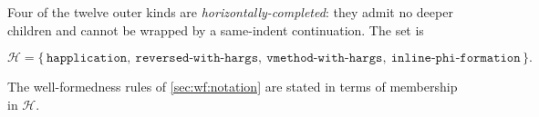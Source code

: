 Four of the twelve outer kinds are \emph{horizontally-completed}:
  they admit no deeper children and cannot be wrapped by a same-indent
   continuation.
The set is

\begin{equation*}
  \mathcal{H} = \{\,
    \mathtt{happlication},\
    \mathtt{reversed\text{-}with\text{-}hargs},\
    \mathtt{vmethod\text{-}with\text{-}hargs},\
    \mathtt{inline\text{-}phi\text{-}formation}
    \,\}.
\end{equation*}

The well-formedness rules of \cref{sec:wf:notation} are stated in terms of
  membership in \(\mathcal{H}\).
